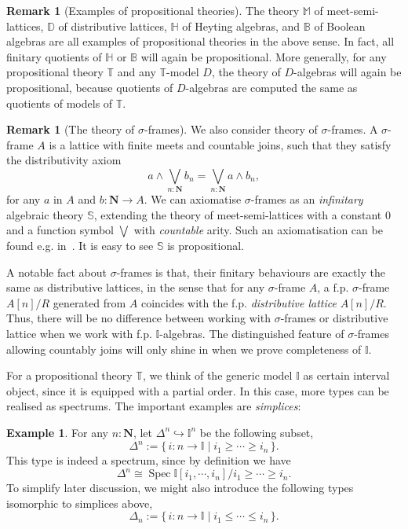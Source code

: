 \documentclass[12pt]{amsart}
\theoremstyle{definition}
\newtheorem{example}[theorem]{Example}
\newtheorem{remark}[theorem]{Remark}
\newcommand{\mb}[1]{\mathbf{#1}}
\newcommand{\mbb}[1]{\mathbb{#1}}
\newcommand{\T}{\mbb T}
\newcommand{\I}{\mbb I}
\newcommand{\scomp}[2]{\{\,#1\mid#2\,\}}
\newcommand{\hook}{\hookrightarrow}
\newcommand{\N}{\mb N}
\newcommand{\spec}{\operatorname{Spec}}
\begin{document}
\begin{remark}[Examples of propositional theories]
  The theory $\mbb M$ of meet-semi-lattices, $\mbb D$ of distributive lattices, $\mbb H$ of Heyting algebras, and $\mbb B$ of Boolean algebras are all examples of propositional theories in the above sense. In fact, all finitary quotients of $\mbb H$ or $\mbb B$ will again be propositional. More generally, for any propositional theory $\T$ and any $\T$-model $D$, the theory of $D$-algebras will again be propositional, because quotients of $D$-algebras are computed the same as quotients of models of $\T$.
\end{remark}

\begin{remark}[The theory of $\sigma$-frames]\label{rem:sigmaframe}
  We also consider theory of $\sigma$-frames. A $\sigma$-frame $A$ is a lattice with finite meets and countable joins, such that they satisfy the distributivity axiom 
  \[ a \wedge \bigvee_{n:\N} b_n = \bigvee_{n:\N} a \wedge b_n, \]
  for any $a$ in $A$ and $b : \N \to A$. We can axiomatise $\sigma$-frames as an \emph{infinitary} algebraic theory $\mbb S$, extending the theory of meet-semi-lattices with a constant $0$ and a function symbol $\bigvee$ with \emph{countable} arity. Such an axiomatisation can be found e.g. in~\cite[Exa. 3.26]{adamek1994locally}. It is easy to see $\mbb S$ is propositional. 

  A notable fact about $\sigma$-frames is that, their finitary behaviours are exactly the same as distributive lattices, in the sense that for any $\sigma$-frame $A$, a f.p. $\sigma$-frame $A[n]/R$ generated from $A$ coincides with the f.p. \emph{distributive lattice} $A[n]/R$. Thus, there will be no difference between working with $\sigma$-frames or distributive lattice when we work with f.p. $\I$-algebras. The distinguished feature of $\sigma$-frames allowing countably joins will only shine in  when we prove completeness of $\I$.
\end{remark}

For a propositional theory $\T$, we think of the generic model $\I$ as certain interval object, since it is equipped with a partial order. In this case, more types can be realised as spectrums. The important examples are \emph{simplices}:

\begin{example}\label{exm:simplicesaffine}
  For any $n : \N$, let $\Delta^n \hook \I^n$ be the following subset,
  \[ \Delta^n := \scomp{i : n \to \I}{i_1 \ge \cdots \ge i_n}. \]
  This type is indeed a spectrum, since by definition we have
  \[ \Delta^n \cong \spec\I[i_1,\cdots,i_n]/i_1\ge\cdots\ge i_n. \]
  To simplify later discussion, we might also introduce the following types isomorphic to simplices above,
  \[ \Delta_n := \scomp{i : n \to \I}{i_1 \le \cdots \le i_n}. \]
\end{example}
\end{document}

